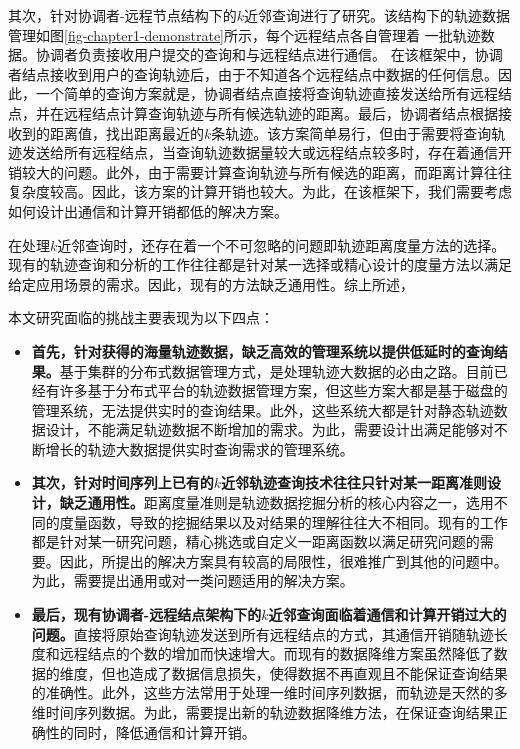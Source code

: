其次，针对协调者-远程节点结构下的$k$近邻查询进行了研究。该结构下的轨迹数据管理如图\ref{fig-chapter1-demonstrate}所示，每个远程结点各自管理着
一批轨迹数据。协调者负责接收用户提交的查询和与远程结点进行通信。
在该框架中，协调者结点接收到用户的查询轨迹后，由于不知道各个远程结点中数据的任何信息。因此，一个简单的查询方案就是，协调者结点直接将查询轨迹直接发送给所有远程结点，并在远程结点计算查询轨迹与所有候选轨迹的距离。最后，协调者结点根据接收到的距离值，找出距离最近的$k$条轨迹。该方案简单易行，但由于需要将查询轨迹发送给所有远程结点，当查询轨迹数据量较大或远程结点较多时，存在着通信开销较大的问题。此外，由于需要计算查询轨迹与所有候选的距离，而距离计算往往复杂度较高。因此，该方案的计算开销也较大。为此，在该框架下，我们需要考虑如何设计出通信和计算开销都低的解决方案。

在处理$k$近邻查询时，还存在着一个不可忽略的问题即轨迹距离度量方法的选择。现有的轨迹查询和分析的工作往往都是针对某一选择或精心设计的度量方法以满足给定应用场景的需求。因此，现有的方法缺乏通用性。综上所述，

本文研究面临的挑战主要表现为以下四点：
\begin{itemize}
	\item \textbf{首先，针对获得的海量轨迹数据，缺乏高效的管理系统以提供低延时的查询结果。}基于集群的分布式数据管理方式，是处理轨迹大数据的必由之路。目前已经有许多基于分布式平台的轨迹数据管理方案，但这些方案大都是基于磁盘的管理系统，无法提供实时的查询结果。此外，这些系统大都是针对静态轨迹数据设计，不能满足轨迹数据不断增加的需求。为此，需要设计出满足能够对不断增长的轨迹大数据提供实时查询需求的管理系统。
	
	\item  \textbf{其次，针对时间序列上已有的$k$近邻轨迹查询技术往往只针对某一距离准则设计，缺乏通用性。}距离度量准则是轨迹数据挖掘分析的核心内容之一，选用不同的度量函数，导致的挖掘结果以及对结果的理解往往大不相同。现有的工作都是针对某一研究问题，精心挑选或自定义一距离函数以满足研究问题的需要。因此，所提出的解决方案具有较高的局限性，很难推广到其他的问题中。为此，需要提出通用或对一类问题适用的解决方案。
	
	\item \textbf{最后，现有协调者-远程结点架构下的$k$近邻查询面临着通信和计算开销过大的问题。}直接将原始查询轨迹发送到所有远程结点的方式，其通信开销随轨迹长度和远程结点的个数的增加而快速增大。而现有的数据降维方案虽然降低了数据的维度，但也造成了数据信息损失，使得数据不再直观且不能保证查询结果的准确性。此外，这些方法常用于处理一维时间序列数据，而轨迹是天然的多维时间序列数据。为此，需要提出新的轨迹数据降维方法，在保证查询结果正确性的同时，降低通信和计算开销。
	
\end{itemize}

